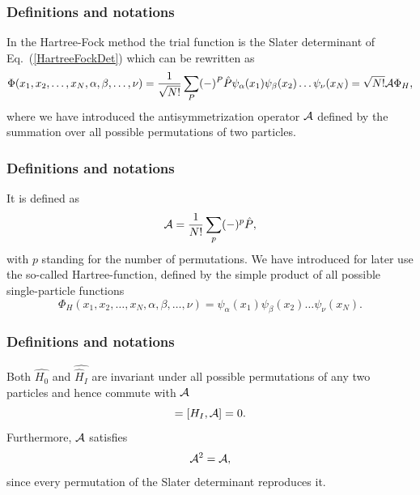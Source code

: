 \frame
{
  \frametitle{Definitions and notations}
\begin{small}
{\scriptsize
In the Hartree-Fock method the trial function is the Slater
determinant of Eq.~(\ref{HartreeFockDet}) which can be rewritten as 
\begin{equation}
  \Phi(x_1,x_2,\dots,x_N,\alpha,\beta,\dots,\nu) = \frac{1}{\sqrt{N!}}\sum_{P} (-)^P\hat{P}\psi_{\alpha}(x_1)
    \psi_{\beta}(x_2)\dots\psi_{\nu}(x_N)=\sqrt{N!}{\cal A}\Phi_H,
\label{HartreeFockPermutation}
\end{equation}
where we have introduced the antisymmetrization operator ${\cal A}$ defined by the 
summation over all possible permutations of two particles.
}
\end{small}
}

\frame
{
  \frametitle{Definitions and notations}
\begin{small}
{\scriptsize
It is defined as
\begin{equation}
  {\cal A} = \frac{1}{N!}\sum_{p} (-)^p\hat{P},
\label{antiSymmetryOperator}
\end{equation}
with $p$ standing for the number of permutations. We have introduced for later use the so-called
Hartree-function, defined by the simple product of all possible single-particle functions
\begin{equation*}
  \Phi_H(x_1,x_2,\dots,x_N,\alpha,\beta,\dots,\nu) =
  \psi_{\alpha}(x_1)
    \psi_{\beta}(x_2)\dots\psi_{\nu}(x_N).
\end{equation*}

}
\end{small}
}

\frame
{
  \frametitle{Definitions and notations}
\begin{small}
{\scriptsize
Both $\hat{H_0}$ and $\hat{\hat{H}_I}$ are invariant under all possible permutations of any two particles
and hence commute with ${\cal A}$
\begin{equation}
  [H_0,{\cal A}] = [H_I,{\cal A}] = 0.
  \label{cummutionAntiSym}
\end{equation}
Furthermore, ${\cal A}$ satisfies
\begin{equation}
  {\cal A}^2 = {\cal A},
  \label{AntiSymSquared}
\end{equation}
since every permutation of the Slater
determinant reproduces it. 
}
\end{small}
}

